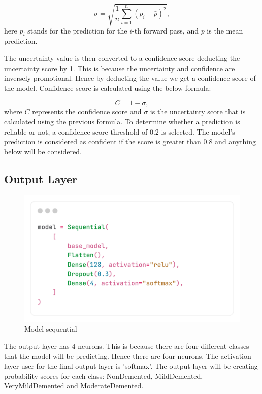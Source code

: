\documentclass[12pt,onecolumn]{report}
\begin{document}
\begin{equation}
\sigma = \sqrt{\frac{1}{n} \sum_{i=1}^{n} (p_i - \bar{p})^2},
\end{equation}
here $p_i$ stands for the prediction for the $i$-th forward pass, and $\bar{p}$ is the mean prediction.

The uncertainty value is then converted to a confidence score deducting the uncertainty score by 1. This is because the uncertainty and confidence are inversely promotional. Hence by deducting the value we get a  confidence score of the model. Confidence score is calculated using the below formula:

\begin{equation}
    C = 1 - \sigma,
\end{equation}
where $C$ represents the confidence score and $\sigma$ is the uncertainty score that is calculated using the previous formula. 
To determine whether a prediction is reliable or not, a confidence score threshold of 0.2 is selected. The model's prediction is considered as confident if the score is greater than 0.8 and anything below will be considered.



\subsection{Output Layer}
\begin{figure}[h!]
    \centering
    \includegraphics[width=0.8\columnwidth]{figures/model_sequential.png}  %
    \caption{Model sequential} %
    \label{fig:sequential model} %
\end{figure}
The output layer has 4 neurons. This is because there are four different classes that the model will be predicting. Hence there are four neurons. The activation layer user for the final output layer is 'softmax'. The output layer will be creating probability scores for each class: NonDemented, MildDemented, VeryMildDemented and ModerateDemented. 
\end{document}
